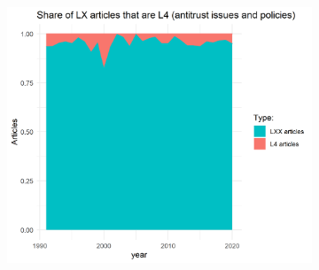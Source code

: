 \documentclass[11pt, letterpaper, twoside]{article}
\begin{document}
\begin{figure}
\begin{subfigure}[h]{0.49\textwidth}
        \includegraphics[width=\textwidth]{L4-vs-LXX-normalized.png}
    \end{subfigure}
\end{figure}
\end{document}

